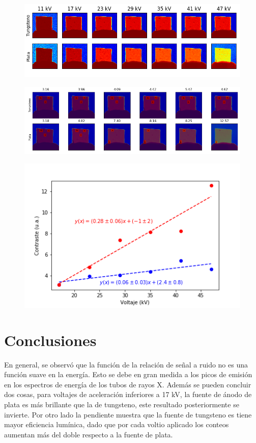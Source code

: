 \documentclass{sciposter}
\begin{document}
\begin{multicols}{3}
	
	\begin{figure}[h]
		\centering
		\includegraphics[width = \linewidth]{Figuras/Images.png}
	\end{figure}
	
	\begin{figure}[h]
		\centering
		\includegraphics[width = \linewidth]{Figuras/ContrasteImages.png}
	\end{figure}
	
	\begin{figure}[h]
		\centering
		\includegraphics[width = 0.7\linewidth]{Figuras/Contraste.png}
	\end{figure}

\section{Conclusiones}
	 En general, se observó que la función de la relación de señal a ruido no es una función suave en la energía. Esto se debe en gran medida a los picos de emisión en los espectros de energía de los tubos de rayos X. Además se pueden concluir dos cosas, para voltajes de aceleración inferiores a 17 kV, la fuente de ánodo de plata es más brillante que la de tungsteno, este resultado posteriormente se invierte. Por otro lado la pendiente muestra que la fuente de tungsteno es tiene mayor eficiencia lumínica, dado que por cada voltio aplicado los conteos aumentan más del doble respecto a la fuente de plata.
	 

\end{multicols}
\end{document}
